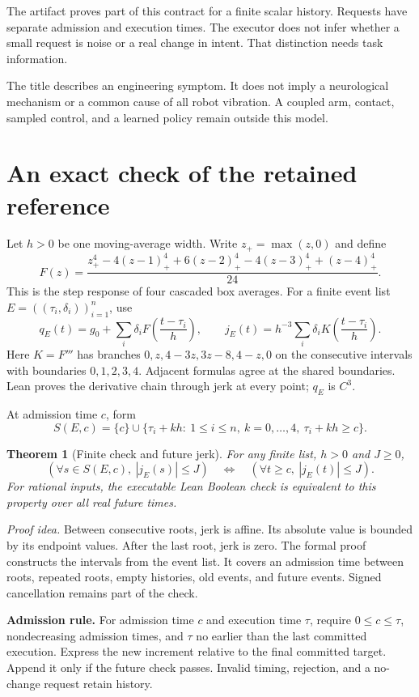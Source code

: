 \documentclass[11pt,letterpaper]{article}
\newtheorem{theorem}{Theorem}
\begin{document}
The artifact proves part of this contract for a finite scalar history. Requests have separate admission and execution times. The executor does not infer whether a small request is noise or a real change in intent. That distinction needs task information.

The title describes an engineering symptom. It does not imply a neurological mechanism or a common cause of all robot vibration. A coupled arm, contact, sampled control, and a learned policy remain outside this model.

\newpage
\section{An exact check of the retained reference}
Let $h>0$ be one moving-average width. Write $z_+=\max(z,0)$ and define
\[
F(z)=\frac{z_+^4-4(z-1)_+^4+6(z-2)_+^4-4(z-3)_+^4+(z-4)_+^4}{24}.
\]
This is the step response of four cascaded box averages. For a finite event list $E=((\tau_i,\delta_i))_{i=1}^n$, use
\[
q_E(t)=g_0+\sum_i\delta_i F\left(\frac{t-\tau_i}{h}\right),\qquad
j_E(t)=h^{-3}\sum_i\delta_i K\left(\frac{t-\tau_i}{h}\right).
\]
Here $K=F'''$ has branches $0,z,4-3z,3z-8,4-z,0$ on the consecutive intervals with boundaries $0,1,2,3,4$. Adjacent formulas agree at the shared boundaries. Lean proves the derivative chain through jerk at every point; $q_E$ is $C^3$.

At admission time $c$, form
\[
S(E,c)=\{c\}\cup\{\tau_i+kh:\ 1\leq i\leq n,\ k=0,\ldots,4,\ \tau_i+kh\geq c\}.
\]
\begin{theorem}[Finite check and future jerk]\label{guard}
For any finite list, $h>0$ and $J\geq0$,
\[
(\forall s\in S(E,c),\ |j_E(s)|\leq J)
\quad\Longleftrightarrow\quad
(\forall t\geq c,\ |j_E(t)|\leq J).
\]
For rational inputs, the executable Lean Boolean check is equivalent to this property over all real future times.
\end{theorem}
\textit{Proof idea.} Between consecutive roots, jerk is affine. Its absolute value is bounded by its endpoint values. After the last root, jerk is zero. The formal proof constructs the intervals from the event list. It covers an admission time between roots, repeated roots, empty histories, old events, and future events. Signed cancellation remains part of the check.

\textbf{Admission rule.} For admission time $c$ and execution time $\tau$, require $0\leq c\leq\tau$, nondecreasing admission times, and $\tau$ no earlier than the last committed execution. Express the new increment relative to the final committed target. Append it only if the future check passes. Invalid timing, rejection, and a no-change request retain history.
\end{document}
